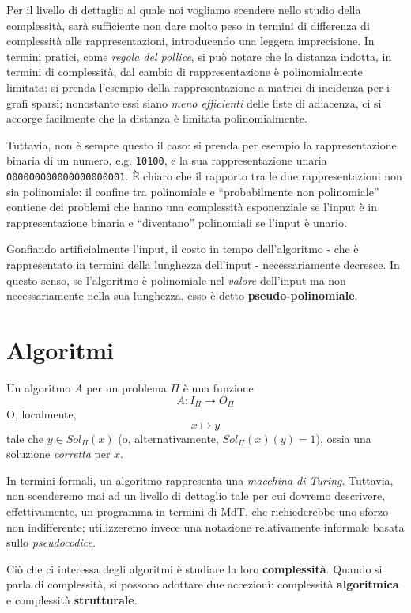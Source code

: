 Per il livello di dettaglio al quale noi vogliamo scendere nello studio della
complessità, sarà sufficiente non dare molto peso in termini di differenza di complessità
alle rappresentazioni, introducendo una leggera imprecisione. In termini pratici,
come \textit{regola del pollice}, si può notare che la distanza indotta,
in termini di complessità, dal cambio di rappresentazione è polinomialmente
limitata: si prenda l'esempio della rappresentazione a matrici di incidenza
per i grafi sparsi; nonostante essi siano \textit{meno efficienti} delle liste
di adiacenza, ci si accorge facilmente che la distanza è limitata polinomialmente.

Tuttavia, non è sempre questo il caso: si prenda per esempio la rappresentazione
binaria di un numero, e.g. \texttt{10100}, e la sua rappresentazione unaria
\texttt{000000000000000000001}. \`E chiaro che il rapporto tra le due
rappresentazioni non sia polinomiale: il confine tra polinomiale e ``probabilmente
non polinomiale'' contiene dei problemi che hanno una complessità esponenziale
se l'input è in rappresentazione binaria e ``diventano'' polinomiali se l'input
è unario.

Gonfiando artificialmente l'input, il costo in tempo dell'algoritmo - che è
rappresentato in termini della lunghezza dell'input - necessariamente decresce.
In questo senso, se l'algoritmo è polinomiale nel \textit{valore} dell'input
ma non necessariamente nella sua lunghezza, esso è detto \textbf{pseudo-polinomiale}.

\section {Algoritmi}
Un algoritmo $A$ per un problema $\Pi$ è una funzione
$$
	A: I_{\Pi} \rightarrow O_{\Pi}
$$
O, localmente,
$$
	x \mapsto y
$$
tale che  $y \in Sol_{\Pi}(x)$ (o, alternativamente, $Sol_{\Pi}(x)(y) = 1$),
ossia una soluzione \textit{corretta} per $x$.

In termini formali, un algoritmo rappresenta una \textit{macchina di Turing}.
Tuttavia, non scenderemo mai ad un livello di dettaglio tale per cui dovremo descrivere,
effettivamente, un programma in termini di MdT, che richiederebbe uno sforzo
non indifferente; utilizzeremo invece una notazione relativamente informale
basata sullo \textit{pseudocodice}.

Ciò che ci interessa degli algoritmi è studiare la loro \textbf{complessità}.
Quando si parla di complessità, si possono adottare due accezioni:
complessità \textbf{algoritmica} e complessità \textbf{strutturale}.

